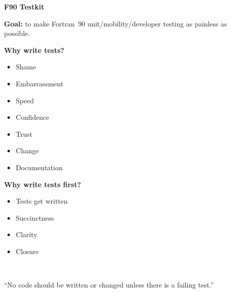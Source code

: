 \documentclass[landscape]{slides}
\begin{document}
\begin{slide}
 \begin{center}
  {\bf\Large F90 Testkit}\\
  \vspace{0.5in}
  \begin{minipage}{6.5in}
    {\bf Goal:} to make Fortran~90 unit/\-mobility/\-developer testing as painless
    as possible.
  \end{minipage}
 \end{center}
\end{slide}
\begin{slide}
  \begin{center}
    {\bf\Large Why write tests?}\\
    \vspace{0.5in}
    \begin{minipage}[t]{3in}
     \begin{itemize}
      \item Shame
      \item Embarrassment
      \item Speed
      \item Confidence
     \end{itemize}
    \end{minipage}
    \begin{minipage}[t]{3in}
     \begin{itemize}
      \item Trust
      \item Change
      \item Documentation
     \end{itemize}
    \end{minipage}
  \end{center}
\end{slide}
\begin{slide}
  \begin{center}
    {\bf\Large Why write tests first?}\\
    \vspace{0.5in}
    \begin{minipage}{3in}
    \begin{itemize}
     \item Tests get written
     \item Succinctness
     \item Clarity
     \item Closure
    \end{itemize}
    \end{minipage}\\
    \vspace{1in}
    \begin{minipage}{5.7in}\raggedright
      ``No code should be written or changed unless there is a failing
      test.''
    \end{minipage}
  \end{center}
\end{slide}
\end{document}
